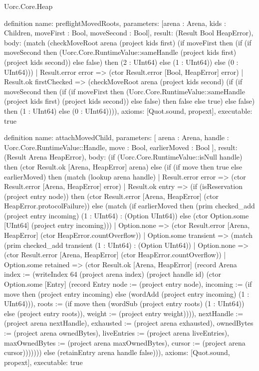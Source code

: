 \begin{lexlean}{Uorc.Core.Heap}
\begin{semanticmodule}
definition{
  name: preflightMovedRoots,
  parameters: [arena : Arena, kids : Children, moveFirst : Bool, moveSecond : Bool],
  result: (Result Bool HeapError),
  body: (match (checkMoveRoot arena (project kids first) (if moveFirst then (if (if moveSecond then (Uorc.Core.RuntimeValue::sameHandle (project kids first) (project kids second)) else false) then (2 : UInt64) else (1 : UInt64)) else (0 : UInt64)))
    | Result.error error => (ctor Result.error [Bool, HeapError] error)
    | Result.ok firstChecked => (checkMoveRoot arena (project kids second) (if (if moveSecond then (if (if moveFirst then (Uorc.Core.RuntimeValue::sameHandle (project kids first) (project kids second)) else false) then false else true) else false) then (1 : UInt64) else (0 : UInt64)))),
  axioms: [Quot.sound, propext],
  executable: true
}

definition{
  name: attachMovedChild,
  parameters: [
    arena : Arena,
    handle : Uorc.Core.RuntimeValue::Handle,
    move : Bool,
    earlierMoved : Bool
  ],
  result: (Result Arena HeapError),
  body: (if (Uorc.Core.RuntimeValue::isNull handle) then (ctor Result.ok [Arena, HeapError] arena) else (if (if move then true else earlierMoved) then (match (lookup arena handle)
    | Result.error error => (ctor Result.error [Arena, HeapError] error)
    | Result.ok entry => (if (isReservation (project entry node)) then (ctor Result.error [Arena, HeapError] (ctor HeapError.protocolFailure)) else (match (if earlierMoved then (prim checked_add (project entry incoming) (1 : UInt64) : (Option UInt64)) else (ctor Option.some [UInt64] (project entry incoming)))
      | Option.none => (ctor Result.error [Arena, HeapError] (ctor HeapError.countOverflow))
      | Option.some transient => (match (prim checked_add transient (1 : UInt64) : (Option UInt64))
        | Option.none => (ctor Result.error [Arena, HeapError] (ctor HeapError.countOverflow))
        | Option.some retained => (ctor Result.ok [Arena, HeapError] (record Arena {index := (writeIndex 64 (project arena index) (project handle id) (ctor Option.some [Entry] (record Entry {node := (project entry node), incoming := (if move then (project entry incoming) else (wordAdd (project entry incoming) (1 : UInt64))), roots := (if move then (wordSub (project entry roots) (1 : UInt64)) else (project entry roots)), weight := (project entry weight)}))), nextHandle := (project arena nextHandle), exhausted := (project arena exhausted), ownedBytes := (project arena ownedBytes), liveEntries := (project arena liveEntries), maxOwnedBytes := (project arena maxOwnedBytes), cursor := (project arena cursor)})))))) else (retainEntry arena handle false))),
  axioms: [Quot.sound, propext],
  executable: true
}


\end{semanticmodule}
\end{lexlean}
